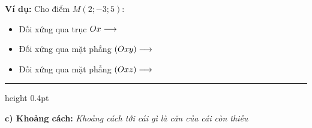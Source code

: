 \documentclass[12pt, a4paper]{article}
\begin{document}
\par\vspace{0.15cm}
\noindent\textbf{\textcolor{deepblue}{Ví dụ:}} Cho điểm $M(2; -3; 5)$:
\begin{itemize}\setlength{\topsep}{1pt}\setlength{\itemsep}{2pt}\setlength{\parskip}{0pt}
    \item Đối xứng qua trục $Ox \longrightarrow \dotfill$
    \item Đối xứng qua mặt phẳng $(Oxy) \longrightarrow \dotfill$
    \item Đối xứng qua mặt phẳng $(Oxz) \longrightarrow \dotfill$
\end{itemize}

\par\vspace{0.2cm}
\hrule height 0.4pt \relax
\par\vspace{0.15cm}

\noindent\textbf{\textcolor{deepblue}{\large c) Khoảng cách:}} \textit{\textcolor{accentred}{Khoảng cách tới cái gì là căn của cái còn thiếu}}
\par\vspace{0.06cm}
\end{document}
